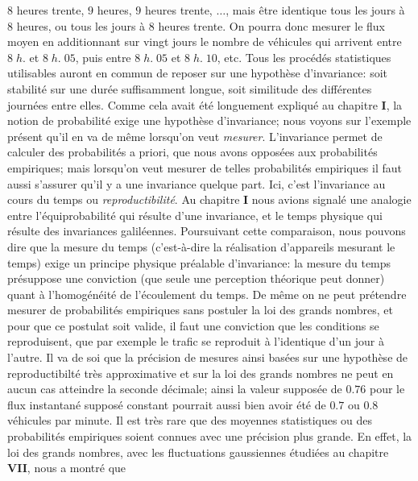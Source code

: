 $8$  heures trente, $9$ heures, $9$  heures trente, $\ldots$, mais \^etre 
identique tous les jours \`a $8$  heures, ou tous les jours \`a $8$  
heures  trente. On pourra donc mesurer le flux moyen en additionnant 
sur vingt jours le nombre de v\'ehicules qui arrivent entre $8\; h.$ et 
$8\; h.\; 05$, puis entre $8\; h.\; 05$ et $8\; h.\; 10$, etc. Tous les 
proc\'ed\'es statistiques utilisables auront en commun  de reposer sur 
une  hypoth\`ese d'invariance: soit stabilit\'e sur une  dur\'ee 
suffisamment longue, soit similitude des diff\'erentes  journ\'ees entre 
elles. Comme cela avait \'et\'e longuement expliqu\'e au chapitre {\bf I}, 
la  notion de probabilit\'e exige une hypoth\`ese d'invariance; nous 
voyons  sur l'exemple pr\'esent qu'il en va de m\^eme lorsqu'on veut {\it 
mesurer}.  
\medskip 
L'invariance permet de calculer des probabilit\'es a priori, que nous  
avons oppos\'ees aux probabilit\'es empiriques; mais lorsqu'on veut 
mesurer de telles probabilit\'es empiriques il faut aussi s'assurer qu'il  
y a une  invariance quelque part. Ici, c'est l'invariance au 
cours du temps ou {\it reproductibilit\'e}. 
\medskip 
Au chapitre {\bf I} nous avions signal\'e une analogie entre 
l'\'equiprobabilit\'e qui r\'esulte d'une invariance, et le temps physique 
qui r\'esulte des invariances galil\'eennes.  Poursuivant cette 
comparaison,  nous pouvons dire que la mesure du temps (c'est-\`a-dire 
la r\'ealisation d'appareils mesurant le temps) exige un principe 
physique pr\'ealable d'invariance:  la mesure du temps pr\'esuppose une 
conviction (que seule une perception th\'eorique peut donner) quant \`a 
l'homog\'en\'eit\'e de l'\'ecoulement du temps.  De  m\^eme on ne peut 
pr\'etendre mesurer de probabilit\'es empiriques sans postuler la loi 
des grands nombres,  et pour que ce postulat soit valide,  il faut une 
conviction que les conditions se reproduisent,  que par exemple le trafic 
se reproduit \`a l'identique d'un jour \`a l'autre.  
\medskip 
Il va de soi que la pr\'ecision de mesures ainsi bas\'ees sur une  
hypoth\`ese de reproductibilt\'e tr\`es approximative et sur la loi des  
grands nombres ne peut en aucun cas atteindre la seconde d\'ecimale; 
ainsi la valeur suppos\'ee de $0.76$ pour le flux instantan\'e suppos\'e 
constant pourrait aussi bien avoir \'et\'e de $0.7$ ou $0.8$ v\'ehicules  
par minute.  Il est tr\`es rare que des moyennes statistiques ou des 
probabilit\'es empiriques soient connues avec une pr\'ecision plus 
grande.  En effet,  la loi des grands nombres,  avec les fluctuations 
gaussiennes \'etudi\'ees au chapitre {\bf VII},  nous a montr\'e que  
